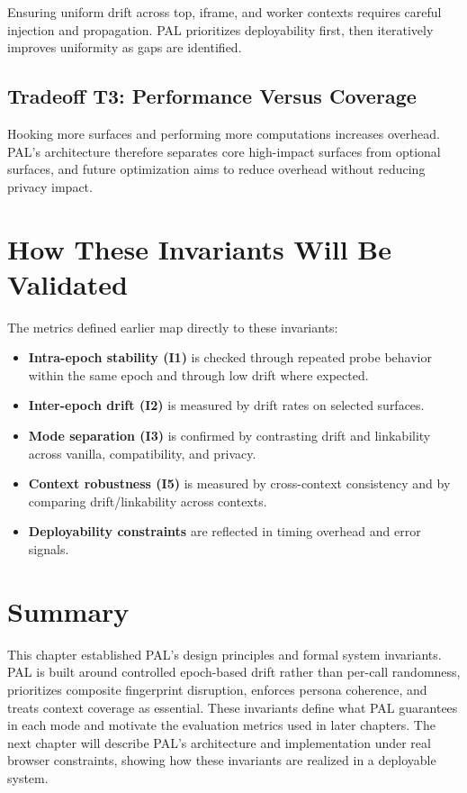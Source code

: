 \documentclass[11pt]{report}
\begin{document}
Ensuring uniform drift across top, iframe, and worker contexts requires careful injection and propagation. PAL prioritizes deployability first, then iteratively improves uniformity as gaps are identified.

\subsection{Tradeoff T3: Performance Versus Coverage}

Hooking more surfaces and performing more computations increases overhead. PAL’s architecture therefore separates core high-impact surfaces from optional surfaces, and future optimization aims to reduce overhead without reducing privacy impact.

\section{How These Invariants Will Be Validated}

The metrics defined earlier map directly to these invariants:

\begin{itemize}
    \item \textbf{Intra-epoch stability (I1)} is checked through repeated probe behavior within the same epoch and through low drift where expected.
    \item \textbf{Inter-epoch drift (I2)} is measured by drift rates on selected surfaces.
    \item \textbf{Mode separation (I3)} is confirmed by contrasting drift and linkability across vanilla, compatibility, and privacy.
    \item \textbf{Context robustness (I5)} is measured by cross-context consistency and by comparing drift/linkability across contexts.
    \item \textbf{Deployability constraints} are reflected in timing overhead and error signals.
\end{itemize}

\section{Summary}

This chapter established PAL’s design principles and formal system invariants. PAL is built around controlled epoch-based drift rather than per-call randomness, prioritizes composite fingerprint disruption, enforces persona coherence, and treats context coverage as essential. These invariants define what PAL guarantees in each mode and motivate the evaluation metrics used in later chapters. The next chapter will describe PAL’s architecture and implementation under real browser constraints, showing how these invariants are realized in a deployable system.
\end{document}

